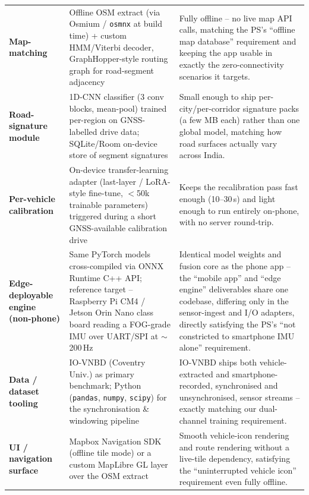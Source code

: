 \documentclass[10.5pt]{article}
\begin{document}
\begin{longtable}{@{}p{2.7cm}p{4.6cm}p{7.4cm}@{}}
\textbf{Map-matching} & Offline OSM extract (via Osmium / \texttt{osmnx} at build time) + custom HMM/Viterbi decoder, GraphHopper-style routing graph for road-segment adjacency & Fully offline -- no live map API calls, matching the PS's ``offline map database'' requirement and keeping the app usable in exactly the zero-connectivity scenarios it targets. \\
\textbf{Road-signature module} & 1D-CNN classifier (3 conv blocks, mean-pool) trained per-region on GNSS-labelled drive data; SQLite/Room on-device store of segment signatures & Small enough to ship per-city/per-corridor signature packs (a few MB each) rather than one global model, matching how road surfaces actually vary across India. \\
\textbf{Per-vehicle calibration} & On-device transfer-learning adapter (last-layer / LoRA-style fine-tune, $<$50k trainable parameters) triggered during a short GNSS-available calibration drive & Keeps the recalibration pass fast enough (10--30\,s) and light enough to run entirely on-phone, with no server round-trip. \\
\textbf{Edge-deployable engine (non-phone)} & Same PyTorch models cross-compiled via ONNX Runtime C++ API; reference target -- Raspberry Pi CM4 / Jetson Orin Nano class board reading a FOG-grade IMU over UART/SPI at $\sim$200\,Hz & Identical model weights and fusion core as the phone app -- the ``mobile app'' and ``edge engine'' deliverables share one codebase, differing only in the sensor-ingest and I/O adapters, directly satisfying the PS's ``not constricted to smartphone IMU alone'' requirement. \\
\textbf{Data / dataset tooling} & IO-VNBD (Coventry Univ.) as primary benchmark; Python (\texttt{pandas}, \texttt{numpy}, \texttt{scipy}) for the synchronisation \& windowing pipeline & IO-VNBD ships both vehicle-extracted and smartphone-recorded, synchronised and unsynchronised, sensor streams -- exactly matching our dual-channel training requirement. \\
\textbf{UI / navigation surface} & Mapbox Navigation SDK (offline tile mode) or a custom MapLibre GL layer over the OSM extract & Smooth vehicle-icon rendering and route rendering without a live-tile dependency, satisfying the ``uninterrupted vehicle icon'' requirement even fully offline. \\
\bottomrule
\end{longtable}
\end{document}
